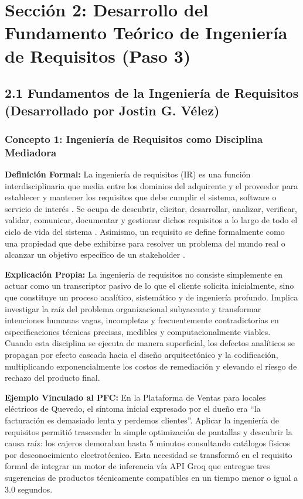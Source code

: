 
\section{Sección 2: Desarrollo del Fundamento Teórico de Ingeniería de Requisitos (Paso 3)}

\subsection{2.1 Fundamentos de la Ingeniería de Requisitos (Desarrollado por Jostin G. Vélez)}

\subsubsection{Concepto 1: Ingeniería de Requisitos como Disciplina Mediadora}
\textbf{Definición Formal:} La ingeniería de requisitos (IR) es una función interdisciplinaria que media entre los dominios del adquirente y el proveedor para establecer y mantener los requisitos que debe cumplir el sistema, software o servicio de interés \cite{ieee29148}. Se ocupa de descubrir, elicitar, desarrollar, analizar, verificar, validar, comunicar, documentar y gestionar dichos requisitos a lo largo de todo el ciclo de vida del sistema \cite{ieee29148, ieee15288}. Asimismo, un requisito se define formalmente como una propiedad que debe exhibirse para resolver un problema del mundo real o alcanzar un objetivo específico de un stakeholder \cite{pohl2025, swebok2024}.

\textbf{Explicación Propia:} La ingeniería de requisitos no consiste simplemente en actuar como un transcriptor pasivo de lo que el cliente solicita inicialmente, sino que constituye un proceso analítico, sistemático y de ingeniería profundo. Implica investigar la raíz del problema organizacional subyacente y transformar intenciones humanas vagas, incompletas y frecuentemente contradictorias en especificaciones técnicas precisas, medibles y computacionalmente viables. Cuando esta disciplina se ejecuta de manera superficial, los defectos analíticos se propagan por efecto cascada hacia el diseño arquitectónico y la codificación, multiplicando exponencialmente los costos de remediación y elevando el riesgo de rechazo del producto final.

\textbf{Ejemplo Vinculado al PFC:} En la Plataforma de Ventas para locales eléctricos de Quevedo, el síntoma inicial expresado por el dueño era ``la facturación es demasiado lenta y perdemos clientes''. Aplicar la ingeniería de requisitos permitió trascender la simple optimización de pantallas y descubrir la causa raíz: los cajeros demoraban hasta 5 minutos consultando catálogos físicos por desconocimiento electrotécnico. Esta necesidad se transformó en el requisito formal de integrar un motor de inferencia vía API Groq que entregue tres sugerencias de productos técnicamente compatibles en un tiempo menor o igual a 3.0 segundos.

